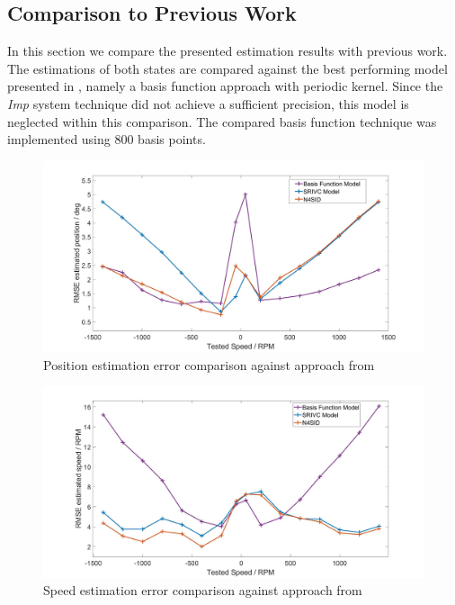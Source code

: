 \documentclass[english]{isasthesis}
\begin{document}
	\subsection{Comparison to Previous Work}
		In this section we compare the presented estimation results with previous work. The estimations of both states are compared against the best performing model presented in \cite{mayerposition}, namely a basis function approach with periodic kernel. Since the \textit{Imp} system technique did not achieve a sufficient precision, this model is neglected within this comparison. The compared basis function technique was implemented using 800 basis points.
	\begin{figure}[p]
    		\centering
    		\includegraphics[width=1\textwidth]{figures/comparison_position.jpg}   
    		\caption{Position estimation error comparison against approach from \cite{mayerposition}}
    		\label{fig:previous work position}
    		\end{figure}
    		\begin{figure}[p]
    		\centering
    		\includegraphics[width=1\textwidth]{figures/comparison_speed.jpg}   
    		\caption{Speed estimation error comparison against approach from \cite{mayerposition}}
    		\label{fig:previous work speed}
    		\end{figure}
    		
\end{document}
